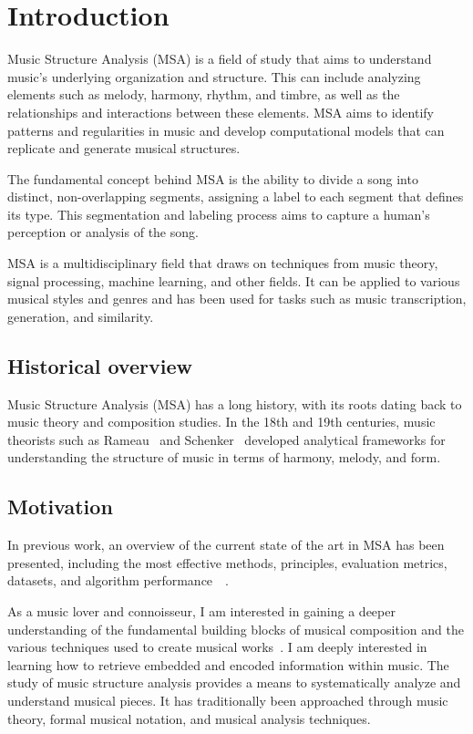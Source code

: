 \normallinespacing

\chapter{Introduction}

Music Structure Analysis (MSA) is a field of study that aims to understand music's underlying organization and structure. This can include analyzing elements such as melody, harmony, rhythm, and timbre, as well as the relationships and interactions between these elements. MSA aims to identify patterns and regularities in music and develop computational models that can replicate and generate musical structures.

The fundamental concept behind MSA is the ability to divide a song into distinct, non-overlapping segments, assigning a label to each segment that defines its type. This segmentation and labeling process aims to capture a human's perception or analysis of the song.

MSA is a multidisciplinary field that draws on techniques from music theory, signal processing, machine learning, and other fields. It can be applied to various musical styles and genres and has been used for tasks such as music transcription, generation, and similarity. 

\section{Historical overview}

Music Structure Analysis (MSA) has a long history, with its roots dating back to music theory and composition studies. In the 18th and 19th centuries, music theorists such as Rameau~\cite{christensen2004rameau} and Schenker~\cite{schenkerdocumentsonline} developed analytical frameworks for understanding the structure of music in terms of harmony, melody, and form.

\section{Motivation}

In previous work, an overview of the current state of the art in MSA has been presented, including the most effective methods, principles, evaluation metrics, datasets, and algorithm performance~\cite{Nieto2020}~\cite{Chaki2021}.

As a music lover and connoisseur, I am interested in gaining a deeper understanding of the fundamental building blocks of musical composition and the various techniques used to create musical works~\cite{choi2017convolutional}. I am deeply interested in learning how to retrieve embedded and encoded information within music. The study of music structure analysis provides a means to systematically analyze and understand musical pieces. It has traditionally been approached through music theory, formal musical notation, and musical analysis techniques.

